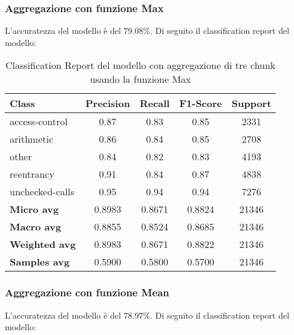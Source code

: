 \documentclass[../../Thesis.tex]{subfiles}
\begin{document}
\subsubsection{Aggregazione con funzione Max}
L'accuratezza del modello è del 79.08\%. Di seguito il classification report del modello:
\begin{table}[H]
    \centering
    \small
    \begin{tabular}{lcccc}
    \hline
    \textbf{Class} & \textbf{Precision} & \textbf{Recall} & \textbf{F1-Score} & \textbf{Support} \\
    \hline
    access-control & 0.87 & 0.83 & 0.85 & 2331 \\
    arithmetic & 0.86 & 0.84 & 0.85 & 2708 \\
    other & 0.84 & 0.82 & 0.83 & 4193 \\
    reentrancy & 0.91 & 0.84 & 0.87 & 4838 \\
    unchecked-calls & 0.95 & 0.94 & 0.94 & 7276 \\
    \hline
    \textbf{Micro avg} & 0.8983 & 0.8671 & 0.8824 & 21346 \\
    \textbf{Macro avg} & 0.8855 & 0.8524 & 0.8685 & 21346 \\
    \textbf{Weighted avg} & 0.8983 & 0.8671 & 0.8822 & 21346 \\
    \textbf{Samples avg} & 0.5900 & 0.5800 & 0.5700 & 21346 \\
    \hline
    \end{tabular}
    \caption{Classification Report del modello con aggregazione di tre chunk usando la funzione Max}
    \end{table}
    

\subsubsection{Aggregazione con funzione Mean}
L'accuratezza del modello è del 78.97\%. Di seguito il classification report del modello:
\end{document}
